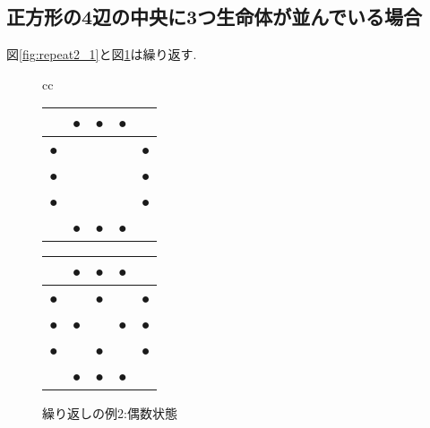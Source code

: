 \documentclass[a4J, 12pt]{jsarticle}
\begin{document}
\subsection{正方形の4辺の中央に3つ生命体が並んでいる場合}
図\ref{fig:repeat2_1}と図\ref{fig:repeat2_2}は繰り返す.
\begin{figure}[tbp]
    \centering
    \begin{tabular}{cc}
        \begin{minipage}[c]{0.5\hsize}
            \centering
            \begin{tabular}{|p{1em}|p{1em}|p{1em}|p{1em}|p{1em}|} \hline
                  & ● & ● & ● & \\ \hline
                ● &   &   &   & ● \\ \hline
                ● &   &   &   & ● \\ \hline
                ● &   &   &   & ● \\ \hline
                  & ● & ● & ● & \\ \hline
            \end{tabular}
            \caption{繰り返しの例2:奇数状態}
            \label{fig:repeat2_1}
        \end{minipage}
        \begin{minipage}[c]{0.5\hsize}
            \centering
            \begin{tabular}{|p{1em}|p{1em}|p{1em}|p{1em}|p{1em}|} \hline
                  & ● & ● & ● & \\ \hline
                ● &   & ● &   & ● \\ \hline
                ● & ● &   & ● & ● \\ \hline
                ● &   & ● &   & ● \\ \hline
                  & ● & ● & ● & \\ \hline
            \end{tabular}
            \caption{繰り返しの例2:偶数状態}
            \label{fig:repeat2_2}
        \end{minipage}
    \end{tabular}
\end{figure}
\end{document}
